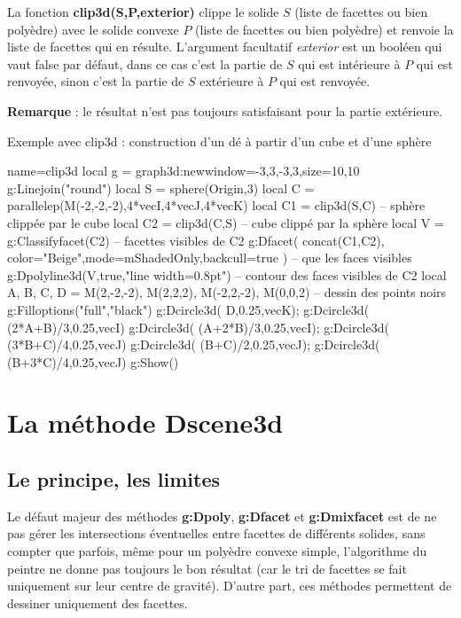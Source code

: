 La fonction \textbf{clip3d(S,P,exterior)} clippe le solide $S$ (liste de facettes ou bien polyèdre) avec le solide convexe $P$ (liste de facettes ou bien polyèdre) et renvoie la liste de facettes qui en résulte. L'argument facultatif \emph{exterior} est un booléen qui vaut false par défaut, dans ce cas c'est la partie de $S$ qui est intérieure à $P$ qui est renvoyée, sinon c'est la partie de $S$ extérieure à $P$ qui est renvoyée.\par
\textbf{Remarque} : le résultat n'est pas toujours satisfaisant pour la partie extérieure.

\begin{demo}[clip3d]{Exemple avec clip3d : construction d'un dé à partir d'un cube et d'une sphère}
\begin{luadraw}{name=clip3d}
local g = graph3d:new{window={-3,3,-3,3},size={10,10}}
g:Linejoin("round")
local S = sphere(Origin,3)
local C = parallelep(M(-2,-2,-2),4*vecI,4*vecJ,4*vecK)
local C1 = clip3d(S,C) -- sphère clippée par le cube
local C2 = clip3d(C,S) -- cube clippé par la sphère
local V = g:Classifyfacet(C2) -- facettes visibles de C2
g:Dfacet( concat(C1,C2), {color="Beige",mode=mShadedOnly,backcull=true} ) -- que les faces visibles
g:Dpolyline3d(V,true,"line width=0.8pt") -- contour des faces visibles de C2
local A, B, C, D = M(2,-2,-2), M(2,2,2), M(-2,2,-2), M(0,0,2) -- dessin des points noirs
g:Filloptions("full","black")
g:Dcircle3d( D,0.25,vecK); g:Dcircle3d( (2*A+B)/3,0.25,vecI)
g:Dcircle3d( (A+2*B)/3,0.25,vecI); g:Dcircle3d( (3*B+C)/4,0.25,vecJ)
g:Dcircle3d( (B+C)/2,0.25,vecJ); g:Dcircle3d( (B+3*C)/4,0.25,vecJ)
g:Show()            
\end{luadraw}
\end{demo}

\section{La méthode Dscene3d}

\subsection{Le principe, les limites}

Le défaut majeur des méthodes \textbf{g:Dpoly}, \textbf{g:Dfacet} et \textbf{g:Dmixfacet} est de ne pas gérer les intersections éventuelles entre facettes de différents solides, sans compter que parfois, même pour un polyèdre convexe simple, l'algorithme du peintre ne donne pas toujours le bon résultat (car le tri de facettes se fait uniquement sur leur centre de gravité). D'autre part, ces méthodes permettent de dessiner uniquement des facettes.

